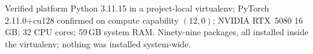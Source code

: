 \begin{keybox}{Verified platform}
Python 3.11.15 in a project-local virtualenv; PyTorch 2.11.0+cu128 confirmed on
compute capability $(12,0)$; NVIDIA RTX~5080 16\,GB; 32 CPU cores; 59\,GB system
RAM. Ninety-nine packages, all installed inside the virtualenv; nothing was
installed system-wide.
\end{keybox}
